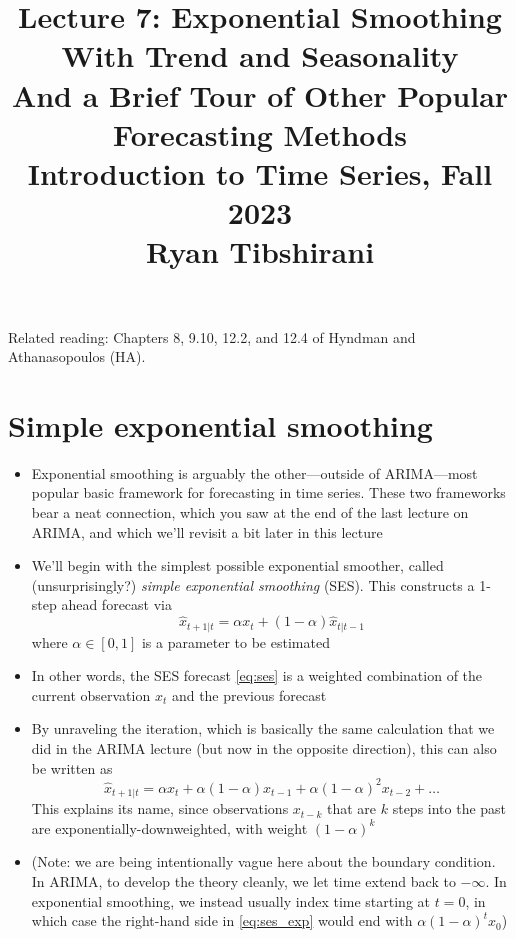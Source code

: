 \documentclass{article}
\title{Lecture 7: Exponential Smoothing With Trend and Seasonality \\ 
\Large And a Brief Tour of Other Popular Forecasting Methods \\ \smallskip
\large Introduction to Time Series, Fall 2023 \\ \smallskip
Ryan Tibshirani}
\date{}
\begin{document}
\maketitle
\RaggedRight
\vspace{-50pt}

Related reading: Chapters 8, 9.10, 12.2, and 12.4 of Hyndman and Athanasopoulos
(HA).

\section{Simple exponential smoothing}

\begin{itemize}
\item Exponential smoothing is arguably the other---outside of ARIMA---most 
  popular basic framework for forecasting in time series. These two frameworks
  bear a neat connection, which you saw at the end of the last lecture on ARIMA,
  and which we'll revisit a bit later in this lecture

\item We'll begin with the simplest possible exponential smoother, called
  (unsurprisingly?) \emph{simple exponential smoothing} (SES). This constructs 
  a 1-step ahead forecast via
  \begin{equation}
  \label{eq:ses}
  \hat{x}_{t+1 | t }= \alpha x_t + (1-\alpha) \hat{x}_{t | t-1}
  \end{equation}
  where $\alpha \in [0,1]$ is a parameter to be estimated

\item In other words, the SES forecast \eqref{eq:ses} is a weighted combination 
  of the current observation $x_t$ and the previous forecast  

\item By unraveling the iteration, which is basically the same calculation that
  we did in the ARIMA lecture (but now in the opposite direction), this can also
  be written as    
  \begin{equation}
  \label{eq:ses_exp}
  \hat{x}_{t+1 | t} = \alpha x_t + \alpha (1-\alpha) x_{t-1} + \alpha
  (1-\alpha)^2 x_{t-2} + \dots
  \end{equation}
  This explains its name, since observations $x_{t-k}$ that are $k$ steps into 
  the past are exponentially-downweighted, with weight $(1-\alpha)^k$  

\item  (Note: we are being intentionally vague here about the boundary 
  condition. In ARIMA, to develop the theory cleanly, we let time extend back to
  $-\infty$. In  exponential smoothing, we instead usually index time starting
  at $t = 0$, in which case the right-hand side in \eqref{eq:ses_exp} would end
  with $\alpha (1-\alpha)^t x_0$)


\end{itemize}
\end{document}
